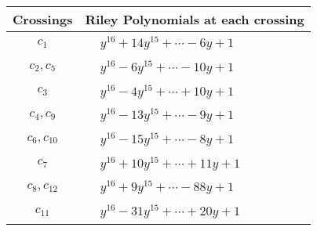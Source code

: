 \documentclass[1p]{elsarticle_modified}
\theoremstyle{definition}
\begin{document}
\begin{tabular}{m{50pt}|m{274pt}}
Crossings & \hspace{64pt}Riley Polynomials at each crossing \\
\hline $$\begin{aligned}c_{1}\end{aligned}$$&$\begin{aligned}
&y^{16}+14 y^{15}+\cdots-6 y+1
\end{aligned}$\\
\hline $$\begin{aligned}c_{2},c_{5}\end{aligned}$$&$\begin{aligned}
&y^{16}-6 y^{15}+\cdots-10 y+1
\end{aligned}$\\
\hline $$\begin{aligned}c_{3}\end{aligned}$$&$\begin{aligned}
&y^{16}-4 y^{15}+\cdots+10 y+1
\end{aligned}$\\
\hline $$\begin{aligned}c_{4},c_{9}\end{aligned}$$&$\begin{aligned}
&y^{16}-13 y^{15}+\cdots-9 y+1
\end{aligned}$\\
\hline $$\begin{aligned}c_{6},c_{10}\end{aligned}$$&$\begin{aligned}
&y^{16}-15 y^{15}+\cdots-8 y+1
\end{aligned}$\\
\hline $$\begin{aligned}c_{7}\end{aligned}$$&$\begin{aligned}
&y^{16}+10 y^{15}+\cdots+11 y+1
\end{aligned}$\\
\hline $$\begin{aligned}c_{8},c_{12}\end{aligned}$$&$\begin{aligned}
&y^{16}+9 y^{15}+\cdots-88 y+1
\end{aligned}$\\
\hline $$\begin{aligned}c_{11}\end{aligned}$$&$\begin{aligned}
&y^{16}-31 y^{15}+\cdots+20 y+1
\end{aligned}$\\
\hline
\end{tabular}\\~\\
\end{document}

